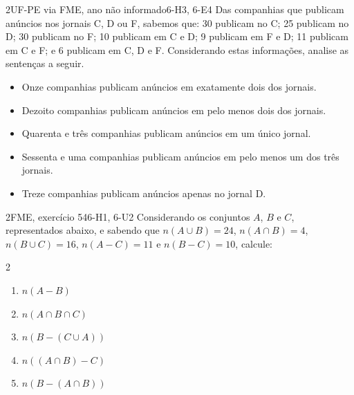 \begin{questao}{2}{UF-PE via FME, ano não informado}{6-H3, 6-E4}\label{u6:ufpe29}
Das companhias que publicam anúncios nos jornais C, D ou F, sabemos que: 30 publicam no C; 25 publicam no D; 30 publicam no F; 10 publicam em C e D; 9 publicam em F e D; 11 publicam em C e F; e 6 publicam em C, D e F. Considerando estas informações, analise as sentenças a seguir.
\begin{itemize}[leftmargin=2.6em,itemsep=0pt]
  \item[0-0)] Onze companhias publicam anúncios em exatamente dois dos jornais.
  \item[1-1)] Dezoito companhias publicam anúncios em pelo menos dois dos jornais.
  \item[2-2)] Quarenta e três companhias publicam anúncios em um único jornal.
  \item[3-3)] Sessenta e uma companhias publicam anúncios em pelo menos um dos três jornais.
  \item[4-4)] Treze companhias publicam anúncios apenas no jornal D.
\end{itemize}
\end{questao}

\begin{questao}{2}{FME, exercício 54}{6-H1, 6-U2}\label{u6:fme54}
Considerando os conjuntos $A$, $B$ e $C$, representados abaixo, e sabendo que $n(A\cup B)=24$, $n(A\cap B)=4$, $n(B\cup C)=16$, $n(A-C)=11$ e $n(B-C)=10$, calcule:
\begin{multicols}{2}
\begin{enumerate}[label=\alph*)]
  \item $n(A-B)$
  \item $n(A\cap B\cap C)$
  \item $n(B-(C\cup A))$
  \item $n((A\cap B)-C)$
  \item $n(B-(A\cap B))$
\end{enumerate}
\end{multicols}
\begin{center}
\end{center}
\end{questao}

